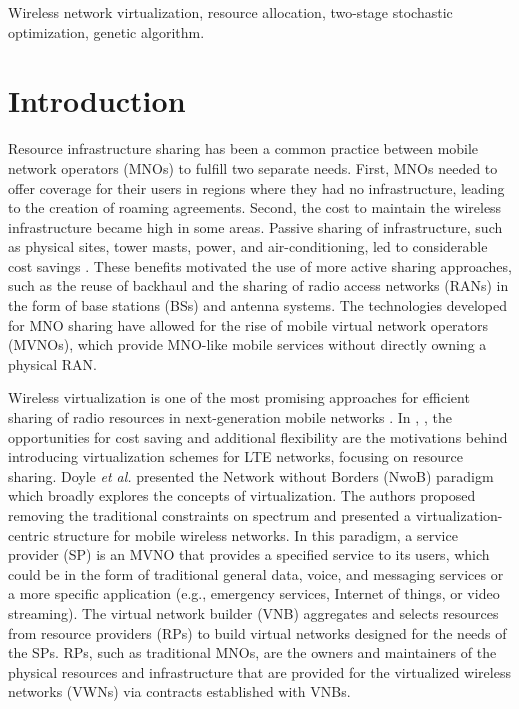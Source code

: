 \documentclass[onecolumn,draftcls]{IEEEtran}
\begin{document}
\begin{IEEEkeywords}
Wireless network virtualization, resource allocation, two-stage stochastic optimization, genetic algorithm.
\end{IEEEkeywords}




%
\IEEEpeerreviewmaketitle



\section{Introduction} \label{sec:intro}
Resource infrastructure sharing has been a common practice between mobile network operators (MNOs) to fulfill two separate needs.  First, MNOs needed to offer coverage for their users in regions where they had no infrastructure, leading to the creation of roaming agreements.  Second, the cost to maintain the wireless infrastructure became high in some areas.  Passive sharing of infrastructure, such as physical sites, tower masts, power, and air-conditioning, led to considerable cost savings \cite{1421931}.  These benefits motivated the use of more active sharing approaches, such as the reuse of backhaul and the sharing of radio access networks (RANs) in the form of base stations (BSs) and antenna systems.  The technologies developed for MNO sharing have allowed for the rise of mobile virtual network operators (MVNOs), which provide MNO-like mobile services without directly owning a physical RAN.

Wireless virtualization is one of the most promising approaches for efficient sharing of radio resources in next-generation mobile networks \cite{6824752}.  In \cite{6553675}, \cite{6571315}, the opportunities for cost saving and additional flexibility are the motivations behind introducing virtualization schemes for LTE networks, focusing on resource sharing.  Doyle \textit{et al.} \cite{6737248} presented the Network without Borders (NwoB) paradigm which broadly explores the concepts of virtualization.  The authors proposed removing the traditional constraints on spectrum and presented a virtualization-centric structure for mobile wireless networks.  In this paradigm, a service provider (SP) is an MVNO that provides a specified service to its users, which could be in the form of traditional general data, voice, and messaging services or a more specific application (e.g., emergency services, Internet of things, or video streaming).  The virtual network builder (VNB) aggregates and selects resources from resource providers (RPs) to build virtual networks designed for the needs of the SPs.  RPs, such as traditional MNOs, are the owners and maintainers of the physical resources and infrastructure that are provided for the virtualized wireless networks (VWNs) via contracts established with VNBs.
\end{document}

